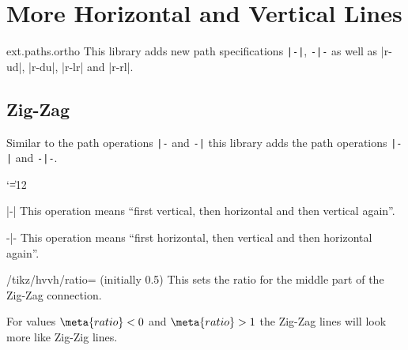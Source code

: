 %
%
%

\section{More Horizontal and Vertical Lines}
\label{library:paths.ortho}

\begin{tikzlibrary}{ext.paths.ortho}
  This library adds new path specifications \verb!|-|!, \verb!-|-! as well as
  |r-ud|, |r-du|, |r-lr| and |r-rl|.
\end{tikzlibrary}

\subsection{Zig-Zag}
Similar to the path operations \verb!|-! and \verb!-|! this library adds
the path operations \verb!|-|! and \verb!-|-!.
{\catcode`\|=12
\begin{pathoperation}[noindex]{|-|}{}
    \pgfmanualpdflabel[\catcode`\|=12 ]{|-|}{}%
    This operation means ``first vertical, then horizontal and then vertical again''.
\end{pathoperation}
\begin{pathoperation}[noindex]{-|-}{}
    \pgfmanualpdflabel[\catcode`\|=12 ]{-|-}{}%
    This operation means ``first horizontal, then vertical and then horizontal again''.
\end{pathoperation}
}
\begin{key}{/tikz/hvvh/ratio= (initially 0.5)}
  This sets the ratio for the middle part of the Zig-Zag connection.
  
  For values $\meta{ratio} < 0$ and $\meta{ratio} > 1$ the Zig-Zag lines will
  look more like Zig-Zig lines.
  \begin{codeexample}[preamble=\usetikzlibrary{paths.ortho}]
  \end{codeexample}
\end{key}
